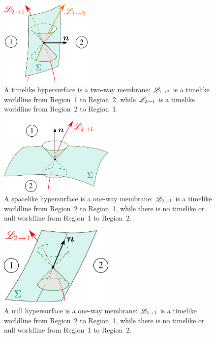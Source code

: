 \begin{figure}
\centerline{\includegraphics[width=0.4\textwidth]{def_timelike_2way.pdf}}
\caption[]{\label{f:def:timelike_2way} \footnotesize
A timelike hypersurface is a two-way membrane: $\mathscr{L}_{1\rightarrow 2}$ is
a timelike worldline from Region~1 to Region~2, while $\mathscr{L}_{2\rightarrow 1}$ is
a timelike worldline from Region~2 to Region~1.}
\end{figure}

\begin{figure}
\centerline{\includegraphics[width=0.5\textwidth]{def_spacelike_1way.pdf}}
\caption[]{\label{f:def:spacelike_1way} \footnotesize
A spacelike hypersurface is a one-way membrane: $\mathscr{L}_{2\rightarrow 1}$ is
a timelike worldline from Region~2 to Region~1, while there is no timelike or null
worldline from Region~1 to Region~2.}
\end{figure}

\begin{figure}
\centerline{\includegraphics[width=0.5\textwidth]{def_null_1way.pdf}}
\caption[]{\label{f:def:null_1way} \footnotesize
A null hypersurface is a one-way membrane: $\mathscr{L}_{2\rightarrow 1}$ is
a timelike worldline from Region~2 to Region~1, while there is no timelike or null
worldline from Region~1 to Region~2.}
\end{figure}

